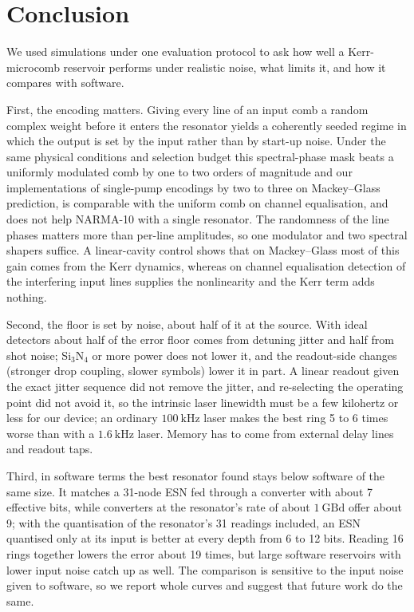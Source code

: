 \section{Conclusion}\label{sec:conclusion}

We used simulations under one evaluation protocol to ask how well a Kerr-microcomb reservoir performs under realistic noise, what
limits it, and how it compares with software.

First, the encoding matters. Giving every line of an input comb a random complex weight before it enters the resonator yields a
coherently seeded regime in which the output is set by the input rather than by start-up noise. Under the same physical conditions and
selection budget this spectral-phase mask beats a uniformly modulated comb by one to two orders of magnitude and our implementations
of single-pump encodings by two to three on Mackey--Glass prediction, is comparable with the uniform comb on channel equalisation, and does not help
NARMA-10 with a single resonator. The randomness of the line phases matters more than per-line amplitudes, so one modulator and two
spectral shapers suffice. A linear-cavity control shows that on Mackey--Glass most of this gain comes from the
Kerr dynamics, whereas on channel equalisation detection of the interfering input lines supplies the nonlinearity and the Kerr term
adds nothing.

Second, the floor is set by noise, about half of it at the source. With ideal detectors about half of the error floor comes from
detuning jitter and half from shot noise; Si$_3$N$_4$ or more power does not lower it, and the readout-side changes (stronger drop
coupling, slower symbols) lower it in part. A linear readout given the exact jitter sequence did not remove the jitter, and
re-selecting the operating point did not avoid it, so the intrinsic laser linewidth must be a few kilohertz or less for our device; an ordinary
$100~\mathrm{kHz}$ laser makes the best ring 5 to 6 times worse than with a $1.6~\mathrm{kHz}$ laser. Memory has to come from external
delay lines and readout taps.

Third, in software terms the best resonator found stays below software of the same size. It matches a 31-node ESN fed through a
converter with about 7 effective bits, while converters at the resonator's rate of about $1~\mathrm{GBd}$ offer about 9; with the
quantisation of the resonator's 31 readings included, an ESN quantised only at its input is better at every depth from 6 to 12 bits.
Reading 16 rings together lowers the error about 19 times, but large software reservoirs with lower input noise catch up as well. The
comparison is sensitive to the input noise given to software, so we report whole curves and suggest that future work do the same.

